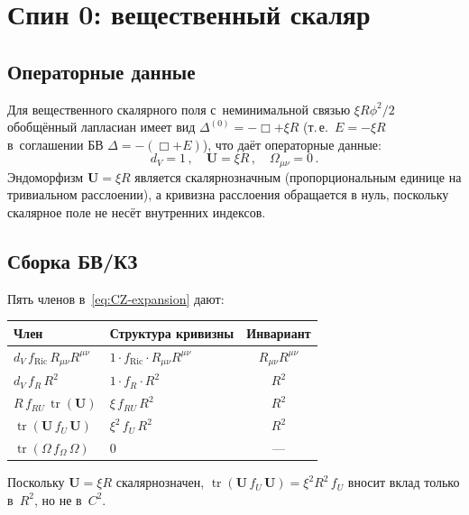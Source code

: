 \documentclass[aps,prd,twocolumn,superscriptaddress,nofootinbib,floatfix]{revtex4-2}
\theoremstyle{definition}
\theoremstyle{remark}
\newcommand{\Ricsq}{R_{\mu\nu}R^{\mu\nu}}
\newcommand{\tr}{\operatorname{tr}}
\begin{document}
\section{Спин 0: вещественный скаляр}
\label{sec:scalar}

\subsection{Операторные данные}

Для вещественного скалярного поля с~неминимальной связью $\xi R\phi^2/2$
обобщённый лапласиан имеет вид
$\Delta^{(0)} = -\Box + \xi R$ (т.\,е.\ $E = -\xi R$ в~соглашении БВ
$\Delta = -(\Box + E)$), что даёт операторные данные:
\begin{equation}
  d_V = 1\,,\quad \mathbf{U} = \xi R\,,\quad
  \Omega_{\mu\nu} = 0\,.
  \label{eq:scalar-data}
\end{equation}
Эндоморфизм $\mathbf{U} = \xi R$ является скалярнозначным
(пропорциональным единице на тривиальном расслоении), а кривизна расслоения
обращается в нуль, поскольку скалярное поле не несёт внутренних индексов.

\subsection{Сборка БВ/КЗ}

Пять членов в~\eqref{eq:CZ-expansion} дают:
\begin{center}
\renewcommand{\arraystretch}{1.15}
\begin{tabular}{@{}llc@{}}
  \toprule
  Член & Структура кривизны & Инвариант \\
  \midrule
  $d_V\,f_{\text{Ric}}\,\Ricsq$ & $1 \cdot f_{\text{Ric}} \cdot \Ricsq$ &
    $\Ricsq$ \\
  $d_V\,f_R\,R^2$ & $1 \cdot f_R \cdot R^2$ & $R^2$ \\
  $R\,f_{RU}\,\tr(\mathbf{U})$ & $\xi\,f_{RU}\,R^2$ & $R^2$ \\
  $\tr(\mathbf{U}\,f_U\,\mathbf{U})$ & $\xi^2\,f_U\,R^2$ & $R^2$ \\
  $\tr(\Omega\,f_\Omega\,\Omega)$ & $0$ & --- \\
  \bottomrule
\end{tabular}
\end{center}
Поскольку $\mathbf{U} = \xi R$ скалярнозначен,
$\tr(\mathbf{U}\,f_U\,\mathbf{U}) = \xi^2 R^2\,f_U$ вносит вклад только
в~$R^2$, но не в~$C^2$.
\end{document}
